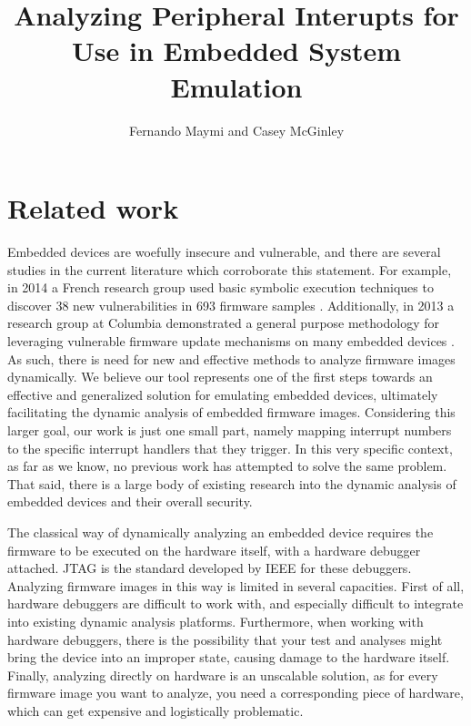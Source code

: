 \documentclass[letterpaper, 10 pt, conference]{ieeeconf}
\title{\LARGE \bf
Analyzing Peripheral Interupts for Use in Embedded System Emulation
}
\author{Fernando Maymi and Casey McGinley}
\begin{document}
\maketitle
\thispagestyle{empty}
\pagestyle{empty}


\section{Related work}
Embedded devices are woefully insecure and vulnerable, and there are several studies in the current literature which corroborate this statement. For example, in 2014 a French research group used basic symbolic execution techniques to discover 38 new vulnerabilities in 693 firmware samples \cite{acostin}. Additionally, in 2013 a research group at Columbia demonstrated a general purpose methodology for leveraging vulnerable firmware update mechanisms on many embedded devices \cite{acui}. As such, there is need for new and effective methods to analyze firmware images dynamically. We believe our tool represents one of the first steps towards an effective and generalized solution for emulating embedded devices, ultimately facilitating the dynamic analysis of embedded firmware images. Considering this larger goal, our work is just one small part, namely mapping interrupt numbers to the specific interrupt handlers that they trigger. In this very specific context, as far as we know, no previous work has attempted to solve the same problem. That said, there is a large body of existing research into the dynamic analysis of embedded devices and their overall security.

The classical way of dynamically analyzing an embedded device requires the firmware to be executed on the hardware itself, with a hardware debugger attached. JTAG \cite{jtag} is the standard developed by IEEE for these debuggers. Analyzing firmware images in this way is limited in several capacities. First of all, hardware debuggers are difficult to work with, and especially difficult to integrate into existing dynamic analysis platforms. Furthermore, when working with hardware debuggers, there is the possibility that your test and analyses might bring the device into an improper state, causing damage to the hardware itself. Finally, analyzing directly on hardware is an unscalable solution, as for every firmware image you want to analyze, you need a corresponding piece of hardware, which can get expensive and logistically problematic. 
\end{document}
